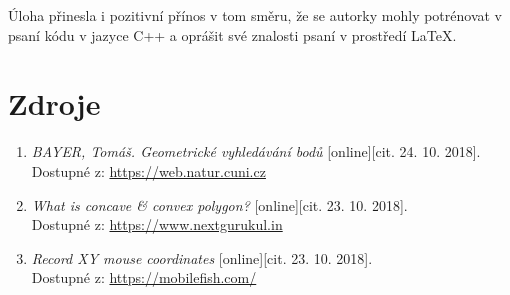 \documentclass[a4paper, 12pt]{article}
\begin{document}
Úloha přinesla i pozitivní přínos v tom směru, že se autorky mohly potrénovat v psaní kódu v jazyce C++ a oprášit své znalosti psaní v prostředí LaTeX.

\clearpage

\section{Zdroje}
\begin{enumerate}
\item  \textsl{BAYER, Tomáš. Geometrické vyhledávání bodů} [online][cit. 24. 10. 2018]. \\
Dostupné z: \href{https://web.natur.cuni.cz/~bayertom/images/courses/Adk/adk3.pdf}{https://web.natur.cuni.cz}
\item  \textsl{What is concave \& convex polygon?} [online][cit. 23. 10. 2018]. \\
Dostupné z: \href{https://www.nextgurukul.in/nganswers/ask-question/answer/What-is-concave-38-convex-polygon-/Understanding-Quadrilaterals/75323.htm}{https://www.nextgurukul.in}
\item \textsl{Record XY mouse coordinates} [online][cit. 23. 10. 2018].\\
Dostupné z: \href{https://mobilefish.com/services/record_mouse_coordinates/record_mouse_coordinates.php}{https://mobilefish.com/}\\

\end{enumerate}
\end{document}
